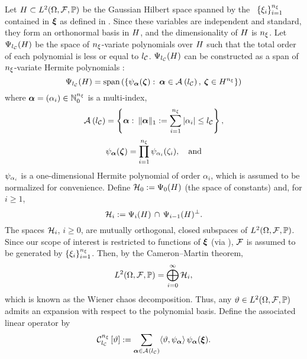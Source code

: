 Let $H \subset L^{2}(\Omega, \mathcal{F}, \mathbb{P})$ be the Gaussian Hilbert space \cite{janson1997} spanned by the \rvs\ $\{ \xi_i \}_{i = 1}^{n_\xi}$ contained in $\bm{\xi}$ as defined in .
Since these variables are independent and standard, they form an orthonormal basis in $H$, and the dimensionality of $H$ is ${n_\xi}$.
Let $\Psi_{l_\mathcal{C}}(H)$ be the space of ${n_\xi}$-variate polynomials over $H$ such that the total order of each polynomial is less or equal to ${l_\mathcal{C}}$.
$\Psi_{l_\mathcal{C}}(H)$ can be constructed as a span of ${n_\xi}$-variate Hermite polynomials \cite{maitre2010, eldred2008}:
\[
  \Psi_{l_\mathcal{C}}(H) = \text{span}\left( \left\{ \psi_{\bm{\alpha}}(\bm{\zeta}): \: \bm{\alpha} \in \mathcal{A}_{}\left( {l_\mathcal{C}} \right), \: \bm{\zeta} \in H^{n_\xi} \right\} \right)
\]
where $\bm{\alpha} = (\alpha_i) \in \mathbb{N}_{0}^{n_\xi}$ is a multi-index,
\begin{equation} \xelab{isotropic-total-order-index-set}
  \chaosMultiindexSet{\nclevel} = \left\{ \multiindex: \: \norm[1]{\multiindex} := \sum_{i = 1}^\nvars |\alpha_i| \leq \nclevel \right\},
\end{equation}
\[
  \psi_{\bm{\alpha}}(\bm{\zeta}) = \prod_{i = 1}^{n_\xi} \psi_{\alpha_i}(\zeta_i), \hspace{1em} \text{and}
\]
$\psi_{\alpha_i}$ is a one-dimensional Hermite polynomial of order $\alpha_i$, which is assumed to be normalized for convenience.
Define $\mathcal{H}_0 := \Psi_0(H)$ (the space of constants) and, for $i \geq 1$,
\[
  \mathcal{H}_i := \Psi_i(H) \, \cap \, \Psi_{i - 1}(H)^\perp.
\]
The spaces $\mathcal{H}_i$, $i \geq 0$, are mutually orthogonal, closed subspaces of $L^{2}(\Omega, \mathcal{F}, \mathbb{P})$.
Since our scope of interest is restricted to functions of $\bm{\xi}$ (via ), $\mathcal{F}$ is assumed to be generated by $\{ \xi_i \}_{i = 1}^{n_\xi}$.
Then, by the Cameron--Martin theorem,
\[
  L^{2}(\Omega, \mathcal{F}, \mathbb{P}) = \bigoplus_{i = 0}^\infty \mathcal{H}_i,
\]
which is known as the Wiener chaos decomposition.
Thus, any $\vartheta \in L^{2}(\Omega, \mathcal{F}, \mathbb{P})$ admits an expansion with respect to the polynomial basis.
Define the associated linear operator by
\begin{equation} \xelab{spectral-decomposition}
  \chaos{\nvars}{\nclevel}{\w} := \sum_{\multiindex \in \chaosMultiindexSet{\nclevel}} \innerProduct{\w, \polynomial_{\multiindex}} \, \polynomial_{\multiindex}(\vz).
\end{equation}
